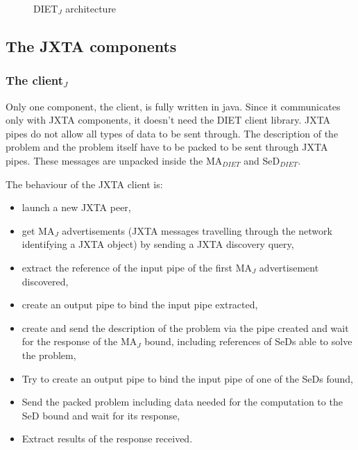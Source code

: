 \begin{figure}[htb]
 \begin{center}
  \caption{DIET$_{J}$ architecture}
 \end{center}
\end{figure}

\subsection{The JXTA components}
\label{ssec:jxtacomponents}

\subsubsection{The client$_{J}$}
\label{sssec:jxtaclient}

Only one component, the client, is fully written in java. Since it
communicates only with JXTA components, it doesn't need the DIET
client library.  JXTA pipes do not allow all types of data to be sent
through. The description of the problem and the problem itself have to
be packed to be sent through JXTA pipes. These messages are unpacked
inside the MA$_{DIET}$ and SeD$_{DIET}$.

The behaviour of the JXTA client is:

\begin {itemize}
\item{launch a new JXTA peer,}
\item{get MA$_{J}$ advertisements (JXTA messages travelling through
    the network identifying a JXTA object) by sending a JXTA discovery
    query,}
\item{extract the reference of the input pipe of the first
    MA$_{J}$ advertisement discovered,}
\item{create an output pipe to bind the input pipe extracted,}
\item{create and send the description of the problem via the pipe
    created and wait for the response of the MA$_{J}$ bound, including
    references of SeDs able to solve the problem,}
\item{Try to create an output pipe to bind the input pipe of one of
    the SeDs found,}
\item{Send the packed problem including data needed for the
    computation to the SeD bound and wait for its response,}
\item{Extract results of the response received.}
\end{itemize}

